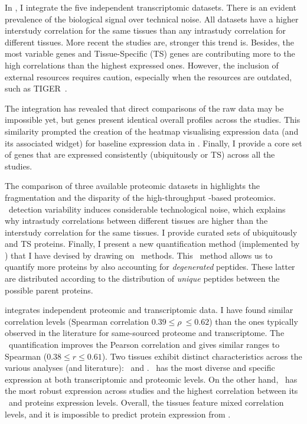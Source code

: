 In ,
I integrate the five independent transcriptomic datasets.
There is an evident prevalence of the biological signal over technical noise.
All datasets have a higher interstudy correlation for the same tissues
than any intrastudy correlation for different tissues.
More recent the studies are, stronger this trend is.
Besides,
the most variable genes and Tissue-Specific (\gls{TS}) genes are contributing
more to the high correlations than the highest expressed ones.
However, the inclusion of external resources requires caution,
especially when the resources are outdated, such as \gls{TIGER}~.

The integration has revealed that
direct comparisons of the raw data may be impossible yet,
but genes present identical overall profiles across the studies.
This similarity prompted the creation of the heatmap visualising expression data
(and its associated widget) for baseline expression data in
.
Finally, I provide a core set of genes that are expressed consistently
(ubiquitously or \gls{TS}) across all the studies.

The comparison of three available proteomic datasets
in  highlights
the fragmentation and the disparity of the high-throughput \ms{}-based proteomics.
\ms\ detection variability induces considerable technological noise,
which explains
why intrastudy correlations between different tissues are
higher than the interstudy correlation for the same tissues.
I provide curated sets of ubiquitously and \gls{TS} proteins.
Finally, I present a new quantification method (implemented by \james) that
I have devised by drawing on \Rnaseq\ methods.
This \PPKM\ method allows us to quantify more proteins
by also accounting for \emph{degenerated} peptides.
These latter are distributed according to the distribution of \emph{unique} peptides
between the possible parent proteins.

 integrates independent proteomic and transcriptomic data.
I have found similar correlation levels
(Spearman correlation $0.39 ≤ \rho\ ≤ 0.62$)
than the ones typically observed in
the literature for same-sourced proteome and transcriptome.
The \PPKM\ quantification improves the Pearson correlation
and gives similar ranges to Spearman ($0.38 ≤ r ≤ 0.61$).
Two tissues exhibit distinct characteristics across the various analyses
(and literature): \Testis\ and \Liver.
\Testis\ has the most diverse and specific expression
at both transcriptomic and proteomic levels.
On the other hand, \Liver\ has the most robust expression across studies
and the highest correlation between its \mRNAs\ and proteins expression levels.
Overall, the tissues feature mixed correlation levels,
and it is impossible to predict protein expression from \mRNA{}.

